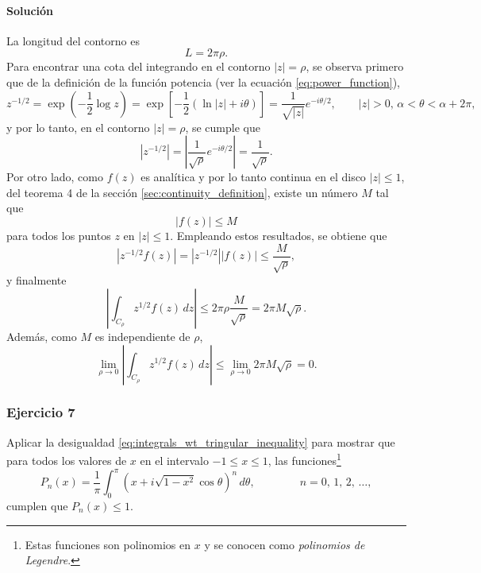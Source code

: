 \documentclass[a4paper]{report}
\begin{document}
\paragraph{Solución} La longitud del contorno es
\[
 L=2\pi\rho.
\]
Para encontrar una cota del integrando en el contorno \(|z|=\rho\), se observa primero que de la definición de la función potencia (ver la ecuación \ref{eq:power_function}),
\[
 z^{-1/2}=\exp\left(-\frac{1}{2}\log z\right)=\exp\left[-\frac{1}{2}(\ln|z|+i\theta)\right]=\frac{1}{\sqrt{|z|}}e^{-i\theta/2},
 \qquad 
 |z|>0,\,\alpha<\theta<\alpha+2\pi,
\]
y por lo tanto, en el contorno \(|z|=\rho\), se cumple que 
\[
 |z^{-1/2}|=\left|\frac{1}{\sqrt{\rho}}e^{-i\theta/2}\right|=\frac{1}{\sqrt{\rho}}.
\]
Por otro lado, como \(f(z)\) es analítica y por lo tanto continua en el disco \(|z|\leq1\), del teorema 4 de la sección \ref{sec:continuity_definition}, existe un número \(M\) tal que 
\[
 |f(z)|\leq M 
\]
para todos los puntos \(z\) en \(|z|\leq1\). Empleando estos resultados, se obtiene que 
\[
 |z^{-1/2}f(z)|=|z^{-1/2}||f(z)|\leq\frac{M}{\sqrt{\rho}},
\]
y finalmente
\[
 \left|\int_{C_\rho}z^{1/2}f(z)\,dz\right|\leq2\pi\rho\frac{M}{\sqrt{\rho}}=2\pi M\sqrt{\rho}.
\]
Además, como \(M\) es independiente de \(\rho\),
\[
 \lim_{\rho\to0}\left|\int_{C_\rho}z^{1/2}f(z)\,dz\right|\leq\lim_{\rho\to0}2\pi M\sqrt{\rho}=0.
\]

\subsubsection{Ejercicio 7}

Aplicar la desigualdad \ref{eq:integrals_wt_tringular_inequality} para mostrar que para todos los valores de \(x\) en el intervalo \(-1\leq x\leq1\), las funciones\footnote{Estas funciones son polinomios en \(x\) y se conocen como \emph{polinomios de Legendre}.}
\[
 P_n(x)=\frac{1}{\pi}\int_0^\pi(x+i\sqrt{1-x^2}\cos\theta)^n\,d\theta,
 \qquad\qquad 
 n=0,\,1,\,2,\,\dots,
\]
cumplen que \(P_n(x)\leq1\).
\end{document}
